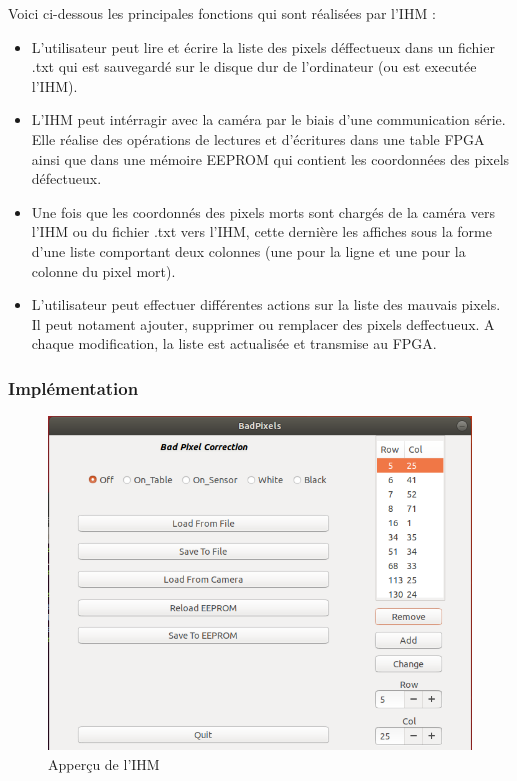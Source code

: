 Voici ci-dessous les principales fonctions qui sont réalisées par l'IHM : 
\newline
\begin{itemize}
	\item L'utilisateur peut lire et écrire la liste des pixels déffectueux dans un fichier .txt qui est sauvegardé sur le disque dur de l'ordinateur (ou est executée l'IHM). 
	\item L'IHM peut intérragir avec la caméra par le biais d'une communication série. Elle réalise des opérations de lectures et d'écritures dans une table FPGA ainsi que dans une mémoire EEPROM qui contient les coordonnées des pixels défectueux. 
	\item Une fois que les coordonnés des pixels morts sont chargés de la caméra vers l'IHM ou du fichier .txt vers l'IHM, cette dernière les affiches sous la forme d'une liste comportant deux colonnes (une pour la ligne et une pour la colonne du pixel mort). 
	\item L'utilisateur peut effectuer différentes actions sur la liste des mauvais pixels. Il peut notament ajouter, supprimer ou remplacer des pixels deffectueux. A chaque modification, la liste est actualisée et transmise au FPGA.

\end{itemize}

\subsubsection{Implémentation}

\begin{figure}[ht]
    \centering
    \includegraphics[scale=0.45]{img/IHM.png}
    \caption{Apperçu de l'IHM}
    \label{fig:CameraCmdsettings}
\end{figure}

